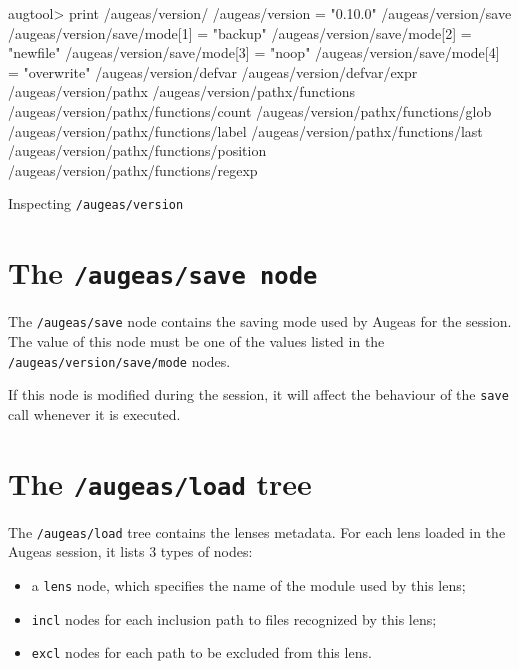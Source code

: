 \begin{listing}
  \begin{augtoolsh}[]
augtool> print /augeas/version/
/augeas/version = "0.10.0"
/augeas/version/save
/augeas/version/save/mode[1] = "backup"
/augeas/version/save/mode[2] = "newfile"
/augeas/version/save/mode[3] = "noop"
/augeas/version/save/mode[4] = "overwrite"
/augeas/version/defvar
/augeas/version/defvar/expr
/augeas/version/pathx
/augeas/version/pathx/functions
/augeas/version/pathx/functions/count
/augeas/version/pathx/functions/glob
/augeas/version/pathx/functions/label
/augeas/version/pathx/functions/last
/augeas/version/pathx/functions/position
/augeas/version/pathx/functions/regexp
  \end{augtoolsh}
  \caption{Inspecting \nolinkurl{/augeas/version}}
  \label{lst:metadata_version}
\end{listing}


\section{The \texttt{/augeas/save node}}

\label{sec:save_node} 

The \nolinkurl{/augeas/save} node contains the saving mode used by Augeas for the session. The value of this node must be one of the values listed in the \nolinkurl{/augeas/version/save/mode} nodes.

If this node is modified during the session, it will affect the behaviour of the \verb!save! call whenever it is executed.

\section{The \texttt{/augeas/load} tree}


The \nolinkurl{/augeas/load} tree contains the lenses metadata. For each lens loaded in the Augeas session, it lists 3 types of nodes:

\begin{itemize}
\item
  a \verb!lens! node, which specifies the name of the module used by this lens;
\item
  \verb!incl! nodes for each inclusion path to files recognized by this lens;
\item
  \verb!excl! nodes for each path to be excluded from this lens.
\end{itemize}

